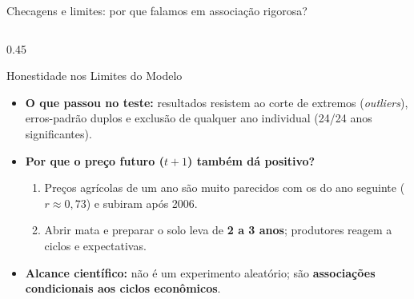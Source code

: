 \documentclass[aspectratio=169,10.5pt]{beamer}
\newcommand{\fonte}[1]{\par\vspace{1mm}{\fontsize{6.5}{7.5}\selectfont\color{gray}Fonte: #1\par}}
\begin{document}
\begin{frame}{Checagens e limites: por que falamos em associação rigorosa?}
\begin{columns}[T]
\begin{column}{0.45\textwidth}
\begin{block}{Honestidade nos Limites do Modelo}
\fontsize{7.8}{9.4}\selectfont
\begin{itemize}
    \setlength{\itemsep}{0.9mm}
    \item \textbf{O que passou no teste:} resultados resistem ao corte de extremos (\textit{outliers}), erros-padrão duplos e exclusão de qualquer ano individual (24/24 anos significantes).
    \item \textbf{Por que o preço futuro ($t+1$) também dá positivo?}
    \begin{enumerate}
        \fontsize{7.3}{8.7}\selectfont
        \item Preços agrícolas de um ano são muito parecidos com os do ano seguinte ($r \approx 0{,}73$) e subiram após 2006.
        \item Abrir mata e preparar o solo leva de \textbf{2 a 3 anos}; produtores reagem a ciclos e expectativas.
    \end{enumerate}
    \item \textbf{Alcance científico:} não é um experimento aleatório; são \textbf{associações condicionais aos ciclos econômicos}.
\end{itemize}
\end{block}
\end{column}
\end{columns}
\end{frame}
\end{document}
